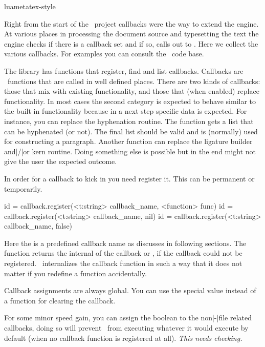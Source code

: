 
\environment luametatex-style


\startdocument[title=Callbacks]

\startsection[title={Introduction}]

Right from the start of the \LUATEX\ project callbacks were the way to extend the
engine. At various places in processing the document source and typesetting the
text the engine checks if there is a callback set and if so, calls out to \LUA.
Here we collect the various callbacks. For examples you can consult the \CONTEXT\
code base.

The  library has functions that register, find and list
callbacks. Callbacks are \LUA\ functions that are called in well defined places.
There are two kinds of callbacks: those that mix with existing functionality, and
those that (when enabled) replace functionality. In most cases the second
category is expected to behave similar to the built in functionality because in a
next step specific data is expected. For instance, you can replace the
hyphenation routine. The function gets a list that can be hyphenated (or not).
The final list should be valid and is (normally) used for constructing a
paragraph. Another function can replace the ligature builder and|/|or kern
routine. Doing something else is possible but in the end might not give the user
the expected outcome.

In order for a callback to kick in you need register it. This can be permanent or
temporarily.

\starttyping[option=LUA]
id = callback.register(<t:string> callback_name, <function> func)
id = callback.register(<t:string> callback_name, nil)
id = callback.register(<t:string> callback_name, false)
\stoptyping

Here the  is a predefined callback name as discusses in
following sections. The function returns the internal \type {id} of the callback
or \type {nil}, if the callback could not be registered. \LUAMETATEX\
internalizes the callback function in such a way that it does not matter if you
redefine a function accidentally.

Callback assignments are always global. You can use the special value 
instead of a function for clearing the callback.

For some minor speed gain, you can assign the boolean  to the
non|-|file related callbacks, doing so will prevent \LUATEX\ from executing
whatever it would execute by default (when no callback function is registered at
all). {\em This needs checking.}

